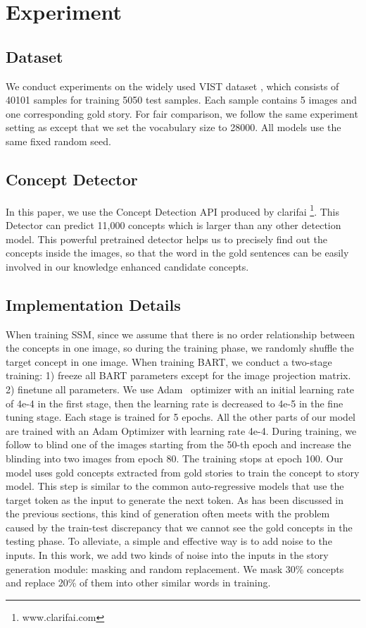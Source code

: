\section{Experiment}
\subsection{Dataset}

We conduct experiments on the widely used VIST dataset \cite{huang2016visual}, which consists of 40101 samples for training 5050 test samples. Each sample contains 5 images and one corresponding gold story. 
For fair comparison, we follow the same experiment setting as \cite{jung2020hide} except that we set the vocabulary size to 28000.
All models use the same fixed random seed.

\subsection{Concept Detector}
In this paper, we use the Concept Detection API produced by clarifai \footnote{\label{footnote-1}www.clarifai.com}. This Detector can predict 11,000 concepts which is larger than any other detection model. This powerful pretrained detector helps us to precisely find out the concepts inside the images, so that the word in the gold sentences can be easily involved in our knowledge enhanced candidate concepts.


\subsection{Implementation Details}

When training SSM, since we assume that there is no order relationship between the concepts in one image, so during the training phase, we randomly shuffle the target concept in one image.
When training BART, we conduct a two-stage training: 1) freeze all BART parameters except for the image projection matrix. 2) finetune all parameters. We use Adam~\cite{kingma2014adam} optimizer with an initial learning rate of 4e-4 in the first stage, then the learning rate is decreased to 4e-5 in the fine tuning stage. Each stage is trained for 5 epochs.
All the other parts of our model are trained with an Adam Optimizer with learning rate 4e-4.
During training, we follow \citet{jung2020hide} to blind one of the images starting from the 50-th epoch and increase the blinding into two images from epoch 80. The training stops at epoch 100.
Our model uses gold concepts extracted from gold stories to train the concept to story model. This step is similar to the common auto-regressive models that use the target token as the input to generate the next token. As has been discussed in the previous sections, this kind of generation often meets with the problem caused by the train-test discrepancy that we cannot see the gold concepts in the testing phase. To alleviate, a simple and effective way is to add noise to the inputs. In this work, we add two kinds of noise into the inputs in the story generation module: masking and random replacement. We mask 30\% concepts and replace 20\% of them into other similar words in training.


